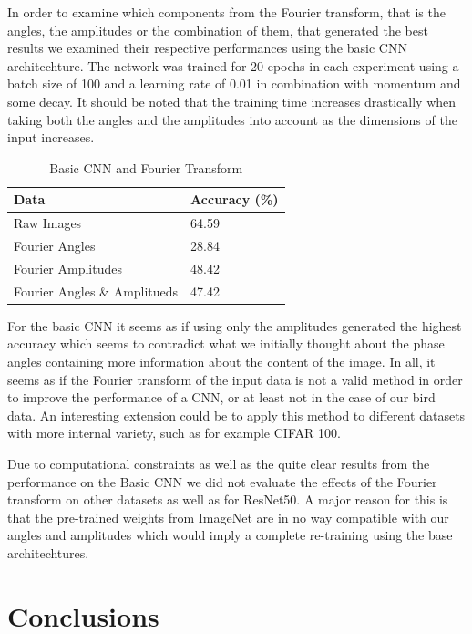\documentclass{article}
\begin{document}
In order to examine which components from the Fourier transform, that is the angles, the amplitudes or the combination of them, that generated the best results we examined their respective performances using the basic CNN architechture. The network was trained for 20 epochs in each experiment using a batch size of 100 and a learning rate of 0.01 in combination with momentum and some decay. It should be noted that the training time increases drastically when taking both the angles and the amplitudes into account as the dimensions of the input increases.

\begin{table}[H]
  \caption{Basic CNN and Fourier Transform}
  \label{sample-table}
  \centering
  \begin{tabular}{ll}
    \toprule
    Data & Accuracy (\%) \\
    \midrule
    Raw Images  & 64.59 \\
    Fourier Angles & 28.84   \\
    Fourier Amplitudes & 48.42 \\
    Fourier Angles \& Amplitueds & 47.42 \\
    \bottomrule
  \end{tabular}
\end{table}

For the basic CNN it seems as if using only the amplitudes generated the highest accuracy which seems to contradict what we initially thought about the phase angles containing more information about the content of the image. In all, it seems as if the Fourier transform of the input data is not a valid method in order to improve the performance of a CNN, or at least not in the case of our bird data. An interesting extension could be to apply this method to different datasets with more internal variety, such as for example CIFAR 100.

\medskip

Due to computational constraints as well as the quite clear results from the performance on the Basic CNN we 
did not evaluate the effects of the Fourier transform on other datasets as well as for ResNet50. 
A major reason for this is that the pre-trained weights from ImageNet are in no way 
compatible with our angles and amplitudes which would imply a complete re-training using the base architechtures.

\section{Conclusions}
\end{document}

